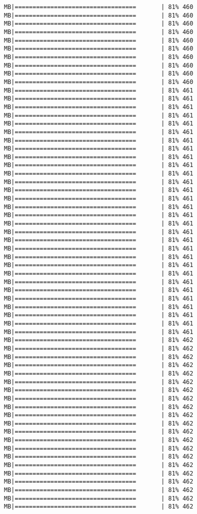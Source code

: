 \documentclass[
]{article}
\begin{document}
\begin{verbatim}
MB|==================================       | 81% 460 MB|==================================       | 81% 460 MB|==================================       | 81% 460 MB|==================================       | 81% 460 MB|==================================       | 81% 460 MB|==================================       | 81% 460 MB|==================================       | 81% 460 MB|==================================       | 81% 460 MB|==================================       | 81% 460 MB|==================================       | 81% 460 MB|==================================       | 81% 461 MB|==================================       | 81% 461 MB|==================================       | 81% 461 MB|==================================       | 81% 461 MB|==================================       | 81% 461 MB|==================================       | 81% 461 MB|==================================       | 81% 461 MB|==================================       | 81% 461 MB|==================================       | 81% 461 MB|==================================       | 81% 461 MB|==================================       | 81% 461 MB|==================================       | 81% 461 MB|==================================       | 81% 461 MB|==================================       | 81% 461 MB|==================================       | 81% 461 MB|==================================       | 81% 461 MB|==================================       | 81% 461 MB|==================================       | 81% 461 MB|==================================       | 81% 461 MB|==================================       | 81% 461 MB|==================================       | 81% 461 MB|==================================       | 81% 461 MB|==================================       | 81% 461 MB|==================================       | 81% 461 MB|==================================       | 81% 461 MB|==================================       | 81% 461 MB|==================================       | 81% 461 MB|==================================       | 81% 461 MB|==================================       | 81% 461 MB|==================================       | 81% 461 MB|==================================       | 81% 462 MB|==================================       | 81% 462 MB|==================================       | 81% 462 MB|==================================       | 81% 462 MB|==================================       | 81% 462 MB|==================================       | 81% 462 MB|==================================       | 81% 462 MB|==================================       | 81% 462 MB|==================================       | 81% 462 MB|==================================       | 81% 462 MB|==================================       | 81% 462 MB|==================================       | 81% 462 MB|==================================       | 81% 462 MB|==================================       | 81% 462 MB|==================================       | 81% 462 MB|==================================       | 81% 462 MB|==================================       | 81% 462 MB|==================================       | 81% 462 MB|==================================       | 81% 462 MB|==================================       | 81% 462 MB|==================================       | 81% 462 
\end{verbatim}
\end{document}
